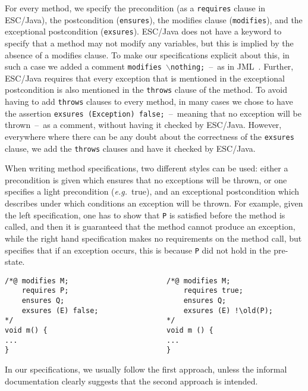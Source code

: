 \documentclass[a4paper]{llncs}
\newcommand{\noth}{\(\backslash\)\texttt{nothing}}
\begin{document}
For every method, we specify the precondition (as a \texttt{requires} clause
in ESC/Java), the postcondition (\texttt{ensures}), the modifies
clause (\texttt{modifies}), and the exceptional postcondition
(\texttt{exsures}). ESC/Java does not have a keyword to specify that a
method may not modify any variables, but this is implied by the
absence of a modifies clause. To make our specifications explicit
about this, in such a case we added a comment
\texttt{modifies \noth;}~--~as in JML~\cite{LeavensBR00}. 
Further, ESC/Java requires that every exception that is mentioned in
the exceptional postcondition is also mentioned in the \texttt{throws}
clause of the method. To avoid having to add \texttt{throws} clauses
to every method, in many cases we chose to have the assertion
\texttt{exsures (Exception) false;}~--~meaning that no exception 
will be thrown~--~as a comment, without having it checked by
ESC/Java. However, everywhere where there can be any doubt about the
correctness of the \texttt{exsures} clause, we add the
\texttt{throws} clauses and have it checked by ESC/Java.

When writing method specifications, two different styles can be used:
either a precondition is given which ensures that no exceptions
will be thrown, or one specifies a light precondition
(\emph{e.g.}~true), and an exceptional postcondition which describes
under which conditions an exception will be thrown. For example, given
the left specification, one has to show that \texttt{P} is satisfied
before the method is called, and then it is guaranteed that the method
cannot produce an exception, while the right hand specification makes
no requirements on the method call, but specifies that if an exception
occurs, this is because \texttt{P} did not hold in the pre-state.
\begin{verbatim}
/*@ modifies M;                       /*@ modifies M;
    requires P;                           requires true;
    ensures Q;                            ensures Q;
    exsures (E) false;                    exsures (E) !\old(P);
*/                                    */
void m() {                            void m () {
...                                   ...
}                                     }
\end{verbatim}

In our specifications, we usually follow the first approach,
unless the informal documentation clearly suggests that the second
approach is intended.
\end{document}
